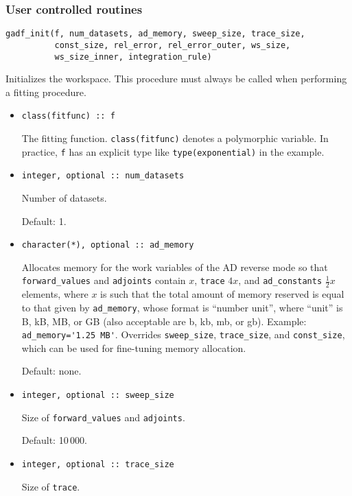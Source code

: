 \documentclass{article}
\begin{document}
\subsubsection{\label{sec:user}User controlled routines}

\begin{verbatim}
gadf_init(f, num_datasets, ad_memory, sweep_size, trace_size,
          const_size, rel_error, rel_error_outer, ws_size, 
          ws_size_inner, integration_rule)
\end{verbatim}
Initializes the workspace. This procedure must always be called when performing a fitting procedure.
\begin{itemize}
\item
\begin{verbatim}
class(fitfunc) :: f
\end{verbatim}
  The fitting function. \verb+class(fitfunc)+ denotes a polymorphic variable. In practice, \texttt{f} has an explicit type like \verb+type(exponential)+ in the example.
\item
\begin{verbatim}
integer, optional :: num_datasets
\end{verbatim}
  Number of datasets.

  Default: 1.
\item
\begin{verbatim}
character(*), optional :: ad_memory
\end{verbatim}
  Allocates memory for the work variables of the AD reverse mode so that \verb+forward_values+ and \verb+adjoints+ contain $x$, \verb+trace+ $4x$, and \verb+ad_constants+ $\frac{1}{2}x$ elements, where $x$ is such that the total amount of memory reserved is equal to that given by \verb+ad_memory+, whose format is ``number unit'', where ``unit'' is B, kB, MB, or GB (also acceptable are b, kb, mb, or gb). Example: \verb+ad_memory='1.25 MB'+. Overrides \verb+sweep_size+, \verb+trace_size+, and \verb+const_size+, which can be used for fine-tuning memory allocation.

  Default: none.
\item
\begin{verbatim}
integer, optional :: sweep_size
\end{verbatim}
  Size of \verb+forward_values+ and \verb+adjoints+.

  Default: 10\,000.
\item
\begin{verbatim}
integer, optional :: trace_size
\end{verbatim}
  Size of \verb+trace+.


\end{itemize}
\end{document}
